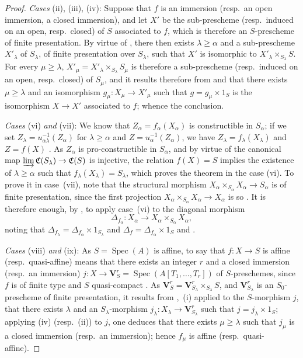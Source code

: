 \begin{proof}
\emph{Cases} (ii), (iii), (iv): Suppose that $f$ is an immersion (resp.\ an open immersion, a closed immersion), and let $X'$ be the sub-prescheme (resp.\ induced on an open, resp.\ closed) of $S$ associated to $f$, which is therefore an $S$-prescheme of finite presentation.
By virtue of , there then exists $\lambda\geqslant\alpha$ and a sub-prescheme $X'_\lambda$ of $S_\lambda$, of finite presentation over $S_\lambda$, such that $X'$ is isomorphic to $X'_\lambda\times_{S_\lambda}S$.
For every $\mu\geqslant\lambda$, $X'_\mu=X'_\lambda\times_{S_\lambda}S_\mu$ is therefore a sub-prescheme (resp.\ induced on an open, resp.\ closed) of $S_\mu$, and it results therefore from  and  that there exists $\mu\geqslant\lambda$ and an isomorphism $g_\mu:X_\mu\to X'_\mu$ such that $g=g_\mu\times 1_S$ is the isomorphism $X\to X'$ associated to $f$; whence the conclusion.

\emph{Cases} (vi) \emph{and} (vii): We know  that $Z_\alpha=f_\alpha(X_\alpha)$ is constructible in $S_\alpha$; if we set $Z_\lambda=u_{\alpha\lambda}^{-1}(Z_\alpha)$ for $\lambda\geqslant\alpha$ and $Z=u_\alpha^{-1}(Z_\alpha)$, we have $Z_\lambda=f_\lambda(X_\lambda)$ and $Z=f(X)$ .
As $Z_\alpha$ is pro-constructible in $S_\alpha$, and by virtue of  the canonical map $\varinjlim\mathfrak{C}(S_\lambda)\to\mathfrak{C}(S)$ is injective, the relation $f(X)=S$ implies the existence of $\lambda\geqslant\alpha$ such that $f_\lambda(X_\lambda)=S_\lambda$, which proves the theorem in the case (vi).
To prove it in case~(vii), note that the structural morphism $X_\alpha\times_{S_\alpha}X_\alpha\to S_\alpha$ is of finite presentation, since the first projection $X_\alpha\times_{S_\alpha}X_\alpha\to X_\alpha$ is so . It is therefore enough, by , to apply case~(vi) to the diagonal morphism
\[
  \Delta_{f_\alpha}:X_\alpha\longrightarrow X_\alpha\times_{S_\alpha}X_\alpha,
\]
noting that $\Delta_{f_\lambda}=\Delta_{f_\alpha}\times1_{S_\lambda}$ and $\Delta_f=\Delta_{f_\alpha}\times1_S$  and .

\emph{Cases} (viii) \emph{and} (ix): As $S=\operatorname{Spec}(A)$ is affine, to say that $f:X\to S$ is affine (resp.\ quasi-affine) means that there exists an integer $r$ and a closed immersion (resp.\ an immersion) $j:X\to\mathbf{V}^r_S=\operatorname{Spec}(A[T_1,\ldots,T_r])$ of $S$-preschemes, since $f$ is of finite type and $S$ quasi-compact .
As $\mathbf{V}^r_S=\mathbf{V}^r_{S_\lambda}\times_{S_\lambda}S$, and $\mathbf{V}^r_{S_\lambda}$ is an $S_0$-prescheme of finite presentation, it results from ,~(i) applied to the $S$-morphism $j$, that there exists $\lambda$ and an $S_\lambda$-morphism $j_\lambda:X_\lambda\to\mathbf{V}^r_{S_\lambda}$ such that $j=j_\lambda\times 1_S$; applying (iv) (resp.\ (ii)) to $j$, one deduces that there exists $\mu\geqslant\lambda$ such that $j_\mu$ is a closed immersion (resp.\ an immersion); hence $f_\mu$ is affine (resp.\ quasi-affine).


\end{proof}
